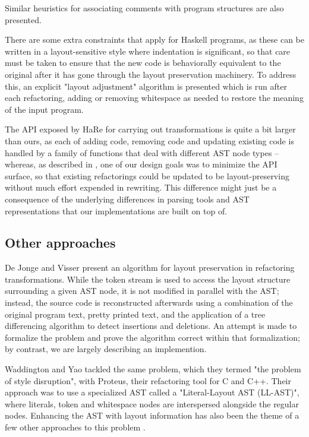 Similar heuristics for associating comments with program structures are also
presented.

There are some extra constraints that apply for Haskell programs, as these can
be written in a layout-sensitive style where indentation is significant, so
that care must be taken to ensure that the new code is behaviorally equivalent
to the original after it has gone through the layout preservation machinery. To
address this, an explicit "layout adjustment" algorithm is presented which is
run after each refactoring, adding or removing whitespace as needed to restore
the meaning of the input program.

The API exposed by HaRe for carrying out transformations is quite a bit larger
than ours, as each of adding code, removing code and updating existing code is
handled by a family of functions that deal with different AST node types --
whereas, as described in , one of our design
goals was to minimize the API surface, so that existing refactorings could be
updated to be layout-preserving without much effort expended in rewriting. This
difference might just be a consequence of the underlying differences in parsing
tools and AST representations that our implementations are built on top of.

\subsection{Other approaches}

De Jonge and Visser \cite{AlgorithmForLayoutPreservation} present an algorithm
for layout preservation in refactoring transformations. While the token stream
is used to access the layout structure surrounding a given AST node, it is not
modified in parallel with the AST; instead, the source code is reconstructed
afterwards using a combination of the original program text, pretty printed
text, and the application of a tree differencing algorithm to detect insertions
and deletions. An attempt is made to formalize the problem and prove the
algorithm correct within that formalization; by contrast, we are largely
describing an implemention.

Waddington and Yao \cite{Proteus} tackled the same problem, which they termed
"the problem of style disruption", with Proteus, their refactoring tool for C
and C++. Their approach was to use a specialized AST called a "Literal-Layout
AST (LL-AST)", where literals, token and whitespace nodes are interspersed
alongside the regular nodes. Enhancing the AST with layout information has also
been the theme of a few other approaches to this problem \cite{RefactorErl}.

